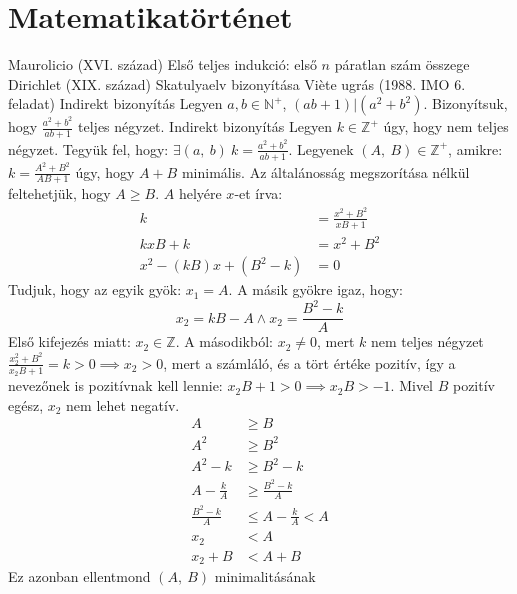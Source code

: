 \documentclass[twoside,12pt]{report}
\theoremstyle{definition}
\begin{document}
\section{Matematikatörténet}
	\begin{outline}
		\1 Maurolicio (XVI. század)	
			\2 Első teljes indukció: első $n$ páratlan szám összege
		\1 Dirichlet (XIX. század)
			\2 Skatulyaelv bizonyítása
		\1 Vi\`ete ugrás (1988. IMO 6. feladat)
			\2  Indirekt bizonyítás
			\2 Legyen $a,b\in\mathbb{N}^+$, $(ab+1)|\left(a^2+b^2\right)$. Bizonyítsuk, hogy $\frac{a^2+b^2}{ab+1}$ teljes négyzet.
			\2 Indirekt bizonyítás
			\2 Legyen $k\in\mathbb{Z}^+$ úgy, hogy nem teljes négyzet. Tegyük fel, hogy: $\exists (a,\ b)\ k=\frac{a^2+b^2}{ab+1}$.
			\2 Legyenek $(A,\ B)\in\mathbb{Z}^+$, amikre: $k=\frac{A^2+B^2}{AB+1}$ úgy, hogy $A+B$ minimális. Az általánosság megszorítása nélkül feltehetjük, hogy $A\ge B$.
			\2 $A$ helyére $x$-et írva:
				\begin{align*}
					k&=\frac{x^2+B^2}{xB+1}\\
					kxB+k&=x^2+B^2\\
					x^2-(kB)x+(B^2-k)&=0
				\end{align*}
			\2 Tudjuk, hogy az egyik gyök: $x_1=A$. A másik gyökre igaz, hogy:
				\begin{equation*}
					x_2=kB-A\wedge x_2=\frac{B^2-k}{A}
				\end{equation*}
			\2 Első kifejezés miatt: $x_2\in\mathbb{Z}$. A másodikból: $x_2\ne0$, mert $k$ nem teljes négyzet
			\2 $\frac{x_2^2+B^2}{x_2B+1}=k>0\implies x_2>0$, mert a számláló, és a tört értéke pozitív, így a nevezőnek is pozitívnak kell lennie: $x_2B+1>0\implies x_2B>-1$. Mivel $B$ pozitív egész, $x_2$ nem lehet negatív.
			\2[] \begin{align*}
				A&\ge B\tag{Mivel mindkét oldal pozitív}\\
				A^2&\ge B^2\\
				A^2-k&\ge B^2-k\tag{Mivel $A>0$}\\
				A-\frac{k}{A}&\ge \frac{B^2-k}{A}\\
				\frac{B^2-k}{A}&\le A-\frac{k}{A}<A\\
				x_2&<A\\
				x_2+B&<A+B
			\end{align*}
			\2 Ez azonban ellentmond $(A,\ B)$ minimalitásának
	\end{outline}
\end{document}
